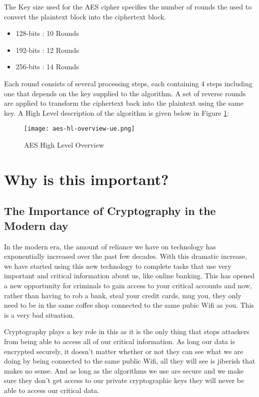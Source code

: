 The Key size used for the AES cipher specifies the number of rounds the used to convert the plaintext block into the ciphertext block.

\begin{itemize}
\item{128-bits : 10 Rounds}
\item{192-bits : 12 Rounds}
\item{256-bits : 14 Rounds}
\end{itemize}

Each round consists of several processing steps, each containing 4 steps including one that depends on the key supplied to the algorithm. A set of reverse rounds are applied to transform the ciphertext back into the plaintext using the same key. A High Level description of the algorithm is given below in Figure \ref{AES-HL-Overview}:

\vspace{0.3cm}

\begin{figure}[h!]
\begin{center}
\texttt{[image: aes-hl-overview-ue.png]}
\end{center}
\caption{AES High Level Overview}
\label{AES-HL-Overview}
\end{figure}


\section{Why is this important?}

\subsection{The Importance of Cryptography in the Modern day}

In the modern era, the amount of reliance we have on technology has exponentially increased over the past few decades. With this dramatic increase, we have started using this new technology to complete tasks that use very important and critical information about us, like online banking. This has opened a new opportunity for criminals to gain access to your critical accounts and now, rather than having to rob a bank, steal your credit cards, mug you, they only need to be in the same coffee shop connected to the same pubic Wifi as you. This is a very bad situation.

Cryptography plays a key role in this as it is the only thing that stops attackers from being able to access all of our critical information. As long our data is encrypted securely, it doesn't matter whether or not they can see what we are doing by being connected to the same public Wifi, all they will see is jiberish that makes no sense. And as long as the algorithms we use are secure and we make sure they don't get access to our private cryptographic keys they will never be able to access our critical data.

